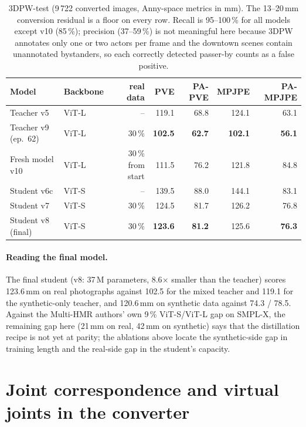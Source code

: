 \begin{table}[h]
\centering\small
\begin{tabular}{llrrrrr}
\toprule
Model & Backbone & real data & PVE & PA-PVE & MPJPE & PA-MPJPE \\
\midrule
Teacher v5 & ViT-L & -- & 119.1 & 68.8 & 124.1 & 63.1 \\
Teacher v9 (ep.\ 62) & ViT-L & 30\,\% & \textbf{102.5} & \textbf{62.7} & \textbf{102.1} & \textbf{56.1} \\
Fresh model v10 & ViT-L & 30\,\% from start & 111.5 & 76.2 & 121.8 & 84.8 \\
Student v6c & ViT-S & -- & 139.5 & 88.0 & 144.1 & 83.1 \\
Student v7 & ViT-S & 30\,\% & 124.5 & 81.7 & 126.2 & 76.8 \\
Student v8 (final) & ViT-S & 30\,\% & \textbf{123.6} & \textbf{81.2} & 125.6 & \textbf{76.3} \\
\bottomrule
\end{tabular}
\caption{3DPW-test (9\,722 converted images, Anny-space metrics in mm). The
13--20\,mm conversion residual is a floor on every row. Recall is 95--100\,\%
for all models except v10 (85\,\%); precision (37--59\,\%) is not meaningful here because 3DPW
annotates only one or two actors per frame and the downtown scenes contain
unannotated bystanders, so each correctly detected passer-by counts as a false
positive.}
\label{tab:test3dpw}
\end{table}

\paragraph{Reading the final model.} The final student (v8: 37\,M
parameters, 8.6$\times$ smaller than the teacher) scores 123.6\,mm on real
photographs against 102.5 for the mixed teacher and 119.1 for the
synthetic-only teacher, and 120.6\,mm on synthetic data against 74.3 / 78.5.
Against the Multi-HMR authors' own 9\,\% ViT-S/ViT-L gap on SMPL-X, the
remaining gap here (21\,mm on real, 42\,mm on synthetic) says that the
distillation recipe is not yet at parity; the ablations above locate the
synthetic-side gap in training length and the real-side gap in the student's
capacity.

\section{Joint correspondence and virtual joints in the converter}
\label{sec:fit_ablation}

